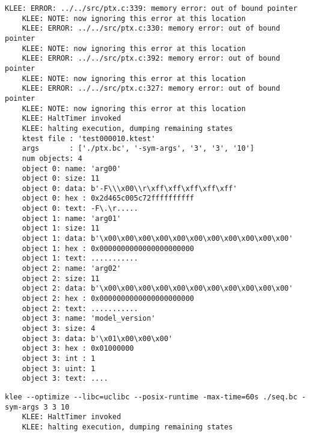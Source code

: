\documentclass[12pt,letterpaper]{article}
\begin{document}
\begin{mdframed}
\begin{lstlisting}[basicstyle=\tiny]
    KLEE: ERROR: ../../src/ptx.c:339: memory error: out of bound pointer
    KLEE: NOTE: now ignoring this error at this location
    KLEE: ERROR: ../../src/ptx.c:330: memory error: out of bound pointer
    KLEE: NOTE: now ignoring this error at this location
    KLEE: ERROR: ../../src/ptx.c:392: memory error: out of bound pointer
    KLEE: NOTE: now ignoring this error at this location
    KLEE: ERROR: ../../src/ptx.c:327: memory error: out of bound pointer
    KLEE: NOTE: now ignoring this error at this location
    KLEE: HaltTimer invoked
    KLEE: halting execution, dumping remaining states
    ktest file : 'test000010.ktest'
    args       : ['./ptx.bc', '-sym-args', '3', '3', '10']
    num objects: 4
    object 0: name: 'arg00'
    object 0: size: 11
    object 0: data: b'-F\\\x00\\r\xff\xff\xff\xff\xff'
    object 0: hex : 0x2d465c005c72ffffffffff
    object 0: text: -F\.\r.....
    object 1: name: 'arg01'
    object 1: size: 11
    object 1: data: b'\x00\x00\x00\x00\x00\x00\x00\x00\x00\x00\x00'
    object 1: hex : 0x0000000000000000000000
    object 1: text: ...........
    object 2: name: 'arg02'
    object 2: size: 11
    object 2: data: b'\x00\x00\x00\x00\x00\x00\x00\x00\x00\x00\x00'
    object 2: hex : 0x0000000000000000000000
    object 2: text: ...........
    object 3: name: 'model_version'
    object 3: size: 4
    object 3: data: b'\x01\x00\x00\x00'
    object 3: hex : 0x01000000
    object 3: int : 1
    object 3: uint: 1
    object 3: text: ....
  \end{lstlisting}
  \begin{lstlisting}[basicstyle=\tiny]
    klee --optimize --libc=uclibc --posix-runtime -max-time=60s ./seq.bc -sym-args 3 3 10
    KLEE: HaltTimer invoked
    KLEE: halting execution, dumping remaining states
  \end{lstlisting}
\end{mdframed}

\newpage
\end{document}
